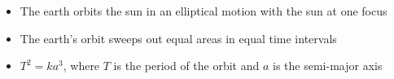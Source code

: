

\vspace*{\fill}
\centering

\begin{itemize}
    \item The earth orbits the sun in an elliptical motion with the sun at one focus
    \item The earth's orbit sweeps out equal areas in equal time intervals
    \item $T^2 = k a^3$, where $T$ is the period of the orbit and $a$ is the semi-major axis
\end{itemize}

\centering
\vspace*{\fill}

